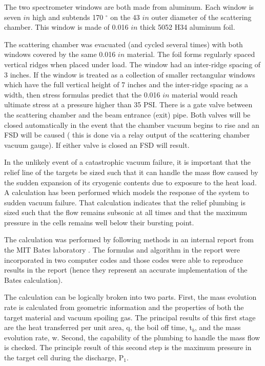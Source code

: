 {The two spectrometer windows are both made from aluminum. Each window
is seven $in$ high and subtends 170 $^\circ$ on the 43 $in$ outer
diameter of the scattering chamber. This window is made of
0.016 $in$ thick 5052 H34 aluminum foil.

The scattering chamber was evacuated (and cycled several times)
with both windows covered by the same 0.016 $in$ material. 
The foil forms regularly spaced vertical ridges when
placed under load. The window had an inter-ridge
spacing of 3 inches.
If the window is treated as a collection
of smaller rectangular windows which have the full vertical height
of 7 inches and the inter-ridge spacing as a width,
then stress formulas predict that the 0.016 $in$
material would reach ultimate stress at a pressure higher than 35 PSI. 
There is a gate valve between the 
scattering chamber and the beam entrance (exit) 
pipe. Both 
valves will be closed automatically in the
event that the chamber vacuum begins to rise and an FSD will be caused
( this is done via a relay output of the scattering
chamber vacuum gauge). If either valve is closed an FSD will result.

In the unlikely event of a catastrophic vacuum failure, it
is important that the relief line of the targets be sized
such that it can handle the mass flow caused by the sudden
expansion of its cryogenic contents due to exposure to the
heat load. A calculation has been performed which
models the response of the system to sudden vacuum failure.
That calculation indicates that the relief plumbing is sized such that the
flow remains subsonic at all times and that the maximum pressure
in the cells remains well below their bursting point.

The calculation was performed  by following methods in 
an internal report from the MIT Bates
laboratory \cite{bi:bates}. The formulas and algorithm in the report were
incorporated in two computer codes and those codes were able to reproduce
results in the report (hence they represent an accurate implementation
of the Bates calculation).

The calculation can be logically broken into two parts. First,
the mass evolution rate is calculated from geometric information
and the properties of both the target material and vacuum spoiling gas.
The principal results of this first stage are the heat transferred
per unit area, q, the boil off time, t$_b$, and the mass evolution rate, w.
Second, the capability of the plumbing to handle the mass flow
is checked. The principle result of this second step is the
maximum pressure in the target cell during the discharge, P$_1$.

}
